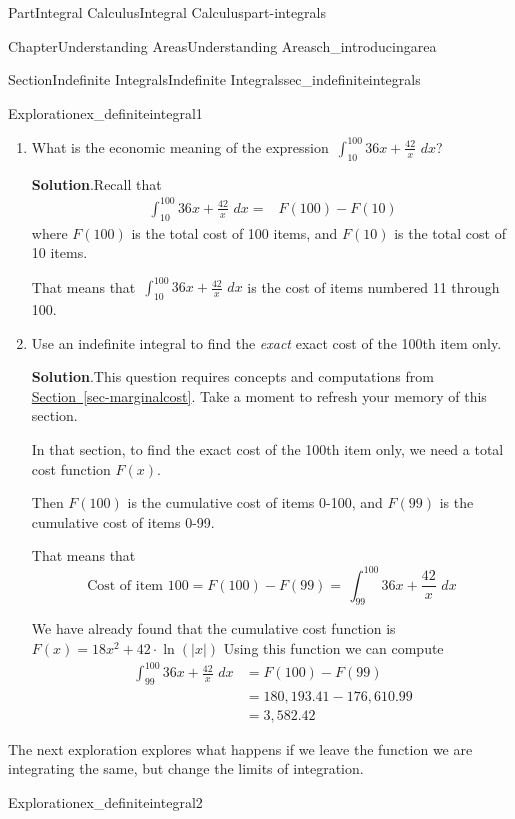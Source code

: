 \documentclass{tufte-book}
\newcommand{\blocktitlefont}{\relax}
\newcommand{\xreffont}{\relax}
\numberwithin{equation}{chapter}
\newcommand{\intdx}[1]{{\,\int#1\,\,dx}}
\newcommand{\amp}{&}
\begin{document}
\begin{partptx}{Part}{Integral Calculus}{}{Integral Calculus}{}{}{part-integrals}
\begin{chapterptx}{Chapter}{Understanding Areas}{}{Understanding Areas}{}{}{ch_introducingarea}
\begin{sectionptx}{Section}{Indefinite Integrals}{}{Indefinite Integrals}{}{}{sec_indefiniteintegrals}
\begin{exploration}{Exploration}{}{ex_definiteintegral1}
\begin{enumerate}[font=\bfseries,label=(\alph*),ref=\alph*]
%
\item{}What is the economic meaning of the expression \(\displaystyle\intdx{_{10}^{100} 36x + \frac{42}{x}}\)?%
\par\smallskip%
\noindent\textbf{\blocktitlefont Solution}.\hypertarget{ex_definiteintegral1-3-2}{}\quad{}Recall that%
\begin{align*}
\intdx{_{10}^{100} 36x + \frac{42}{x}}  = \amp F(100) - F(10) 
\end{align*}
where \(F(100)\) is the total cost of 100 items, and \(F(10)\) is the total cost of 10 items.%
\par
That means that \(\intdx{_{10}^{100} 36x + \frac{42}{x}}\) is the cost of items numbered 11 through 100.%
\item{}Use an indefinite integral to find the \emph{exact} exact cost of the 100th item only.%
\par\smallskip%
\noindent\textbf{\blocktitlefont Solution}.\hypertarget{ex_definiteintegral1-4-2}{}\quad{}This question requires concepts and computations from  \hyperref[sec-marginalcost]{Section~{\xreffont\ref{sec-marginalcost}}}. Take a moment to refresh your memory of this section.%
\par
In that section, to find the exact cost of the 100th item only, we need a total cost function \(F(x)\).%
\par
Then \(F(100)\) is the cumulative cost of items 0-100, and \(F(99)\) is the cumulative cost of items 0-99.%
\par
That means that%
\begin{equation*}
\text{Cost of item }100 = F(100) - F(99) = \intdx{_{99}^{100}  36x + \frac{42}{x} }
\end{equation*}
%
\par
We have already found that the cumulative cost function is \(F(x)  = 18x^2 + 42\cdot \ln(|x|)\) Using this function we can compute%
\begin{align*}
\intdx{_{99}^{100}  36x + \frac{42}{x} } \amp = F(100) - F(99)\\
\amp =180,193.41 - 176,610.99\\
\amp = 3,582.42 
\end{align*}
%
\end{enumerate}%
\end{exploration}%
The next exploration explores what happens if we leave the function we are integrating the same, but change the limits of integration.%
\begin{exploration}{Exploration}{}{ex_definiteintegral2}%
\begin{enumerate}[font=\bfseries,label=(\alph*),ref=\alph*]%

\end{enumerate}
\end{exploration}
\end{sectionptx}
\end{chapterptx}
\end{partptx}
\end{document}
